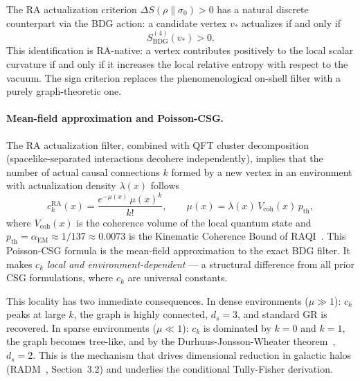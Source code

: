 \documentclass[11pt,a4paper]{article}
\theoremstyle{plain}
\theoremstyle{definition}
\theoremstyle{remark}
\begin{document}
The RA actualization criterion $\Delta S(\rho\|\sigma_0) > 0$ has a natural
discrete counterpart via the BDG action: a candidate vertex $v_*$ actualizes
if and only if
\begin{equation}
  S_{\mathrm{BDG}}^{(4)}(v_*) > 0.
  \label{eq:BDG_filter}
\end{equation}
This identification is RA-native: a vertex contributes positively to the local
scalar curvature if and only if it increases the local relative entropy with
respect to the vacuum. The sign criterion replaces the phenomenological
on-shell filter with a purely graph-theoretic one.

\paragraph{Mean-field approximation and Poisson-CSG.}
The RA actualization filter, combined with QFT cluster decomposition
(spacelike-separated interactions decohere independently), implies that the
number of actual causal connections $k$ formed by a new vertex in an environment
with actualization density $\lambda(x)$ follows
\begin{equation}
  c_k^{\mathrm{RA}}(x) = \frac{e^{-\mu(x)}\,\mu(x)^k}{k!},
  \qquad
  \mu(x) = \lambda(x)\,V_{\mathrm{coh}}(x)\,p_{\mathrm{th}},
  \label{eq:poisson_ck}
\end{equation}
where $V_{\mathrm{coh}}(x)$ is the coherence volume of the local quantum state
and $p_{\mathrm{th}} = \alpha_{\mathrm{EM}} \approx 1/137 \approx 0.0073$ is the Kinematic Coherence Bound of
RAQI~\citep{Sandeman2026RAQI}. This Poisson-CSG formula is the mean-field
approximation to the exact BDG filter. It makes $c_k$ \emph{local and
environment-dependent} --- a structural difference from all prior CSG
formulations, where $c_k$ are universal constants.

This locality has two immediate consequences. In dense environments
($\mu \gg 1$): $c_k$ peaks at large $k$, the graph is highly connected, $d_s
= 3$, and standard GR is recovered. In sparse environments ($\mu \ll 1$): $c_k$
is dominated by $k = 0$ and $k = 1$, the graph becomes tree-like, and by the
Durhuus-Jonsson-Wheater theorem~\citep{Durhuus2010}, $d_s = 2$. This is the
mechanism that drives dimensional reduction in galactic halos
(RADM~\citep{Sandeman2026RADM}, Section~3.2) and underlies the conditional
Tully-Fisher derivation.
\end{document}
